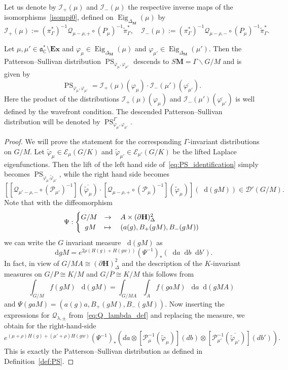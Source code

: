 \documentclass[AHL, Unicode, longabstracts, published]{cedram}
\DeclareMathOperator{\Eig}{Eig}
\newcommand{\mc}{\mathcal}
\newcommand{\cc}{\mathbb{C}}
\newcommand{\bfh}{\mathbf{H}}
\newcommand{\bfm}{\mathbf{M}}
\newcommand{\pl}{\partial}
\newcommand{\til}{\widetilde}
\newcommand{\intd}{\mathop{}\!\mathrm{d}}
\renewcommand{\a}{\mathfrak a}
\begin{document}
Let us denote by $\mc{I}_+(\mu)$ and $\mc{I}_-(\mu)$ the respective inverse maps of the isomorphisms~\eqref{isompi0}, defined on $\Eig_{\Delta_{\bfm}}(\mu)$ by
\[
\mc{I}_+(\mu):=(\pi_\Gamma^*)^{-1}\mathcal Q_{\mu-\rho,+}\circ(P_{\mu})^{-1}\til\pi_\Gamma^*,\quad
\mc{I}_-(\mu):=(\pi_\Gamma^*)^{-1}\mathcal Q_{\mu-\rho,-}\circ(P_{\mu})^{-1}\til\pi_\Gamma^*.
\]
\begin{theo}\label{thm:patterson_sullivan}
Let $\mu,\mu'\in \a^*_\cc\setminus\mathbf{Ex}$ and $\varphi_\mu \in \Eig_{\Delta_{\bfm}}(\mu)$ and $\varphi_{\mu'} \in \Eig_{\Delta_{\bfm}}(\mu')$. Then the Patterson--Sullivan distribution $ \operatorname{PS}_{\varphi_\mu,\varphi_{\mu'}}$ descends to $S{\bfm}=\Gamma\backslash G/M$ and is given by
\begin{equation}\label{eq:PS_identification}
\operatorname{PS}_{\varphi_\mu,\varphi_{\mu'}} = \mathcal I_+(\mu)(\varphi_{\mu})\cdot \mathcal I_-(\mu')(\overline{\varphi_{\mu'}}).
\end{equation}
Here the product of the distributions $\mathcal I_+(\mu)(\varphi_\mu)$ and $\mathcal I_-(\mu')(\overline{\varphi_{\mu'}})$ is well defined by the wavefront condition. The descended Patterson--Sullivan distribution will be denoted by $\operatorname{PS}^\Gamma_{\varphi_\mu,\varphi_{\mu'}}$.
\end{theo}


\begin{proof}
We will prove the statement for the corresponding $\Gamma$-invariant distributions on $G/M$. Let $\til \varphi_\mu\in \mathcal E_\mu(G/K)$ and $\til\varphi_{\mu'}\in \mathcal E_{\mu'}(G/K)$ be the lifted Laplace eigenfunctions. Then the lift of the left hand side of~\eqref{eq:PS_identification} simply becomes $\operatorname{PS}_{\til \varphi_\mu.\til \varphi_{\mu'}}$, while the right hand side becomes
\[
\left[\left[\mathcal Q_{\mu'-\rho,-}\circ(\mathcal P_{\mu'})^{-1}\right](\overline {\til\varphi_\mu})\cdot \left[\mathcal Q_{\mu-\rho,+}\circ(\mathcal P_{\mu})^{-1}\right] (\til\varphi_{\mu})\right](\intd (gM))
\in\mc{D}'(G/M).
\]
Note that with the diffeomorphism
\[
\Psi:
\begin{cases}
G/M &\rightarrow\quad A\times \mathcal (\pl{\bfh})_\Delta^2\\
\mkern10mu gM &\mapsto\quad (a(g), B_+(gM), B_-(gM))
\end{cases}
\]
we can write the $G$ invariant measure $\intd (gM)$ as
\[
\intd gM = e^{2\rho(H(g) + H(gw))} (\Psi^{-1})_* (\intd a\intd b\intd b').
\]
In fact, in view of $G/MA\cong (\pl{\bfh})^2_\Delta$ and the description of the $K$-invariant measures on $G/P\cong K/M$ and $G/\overline P\cong K/M$ this follows from
\[
\int_{G/M} f(gM)~\intd (gM) =
\int_{G/MA}\int_A f(gaM)~\intd a\intd (gMA)
\]
and $\Psi(gaM)=(a(g)a,B_+(gM), B_-(gM))$. Now inserting the expressions for $\mathcal Q_{\lambda,\pm}$ from~\eqref{eq:Q_lambda_def} and replacing the measure, we obtain for the right-hand-side
\[
e^{(\mu+\rho)H(g) + (\mu'+\rho)H(gw)}(\Psi^{-1})_*\left(da \otimes \left[\mathcal P_{\mu}^{-1}(\til\varphi_{\mu})\right](db)
\otimes \left[\mathcal P_{\mu'}^{-1}(\overline{\til\varphi_{\mu'}})\right](db')
\right).
\]
This is exactly the Patterson--Sullivan distribution as defined in Definition~\ref{def:PS}.
\end{proof}
\end{document}
